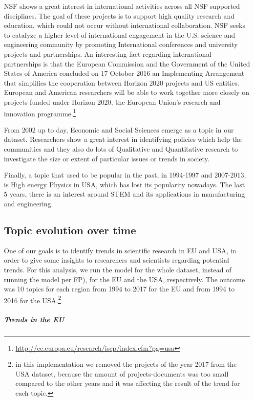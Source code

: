 \documentclass[12pt]{report}
\begin{document}
NSF shows a great interest in international activities across all NSF supported
disciplines. The goal of these projects is to support high quality research and
education, which could not occur without international collaboration. NSF seeks
to catalyze a higher level of international engagement in the U.S. science and
engineering community by promoting International conferences and university
projects and partnerships. An interesting fact regarding international
partnerships is that the European Commission and the Government of the United
States of America concluded on 17 October 2016 an Implementing Arrangement that
simplifies the cooperation between Horizon 2020 projects and US entities.
European and American researchers will be able to work together more closely on
projects funded under Horizon 2020, the European Union's research and innovation
programme.\footnote{\url{http://ec.europa.eu/research/iscp/index.cfm?pg=usa}}

From 2002 up to day, Economic and Social Sciences emerge as a topic in our
dataset. Researchers show a great interest in identifying policies which help
the communities and they also do lots of Qualitative and Quantitative research
to investigate the size or extent of particular issues or trends in society.

Finally, a topic that used to be popular in the past, in 1994-1997 and
2007-2013, is High energy Physics in USA, which has lost its popularity
nowadays. The last 5 years, there is an interest around STEM and its
applications in manufacturing and engineering.


\subsection{Topic evolution over time}

One of our goals is to identify trends in scientific research in EU and USA, in
order to give some insights to researchers and scientists regarding potential
trends. For this analysis, we run the model for the whole dataset, instead of
running the model per FP), for the EU and the USA, respectively. The outcome was
10 topics for each region from 1994 to 2017 for the EU and from 1994 to 2016 for
the USA.\footnote{in this implementation we removed the projects of the year
2017 from the USA dataset, because the amount of projects-documents was too
small compared to the other years and it was affecting the result of the trend
for each topic.}

\subparagraph{Trends in the EU}
\end{document}
